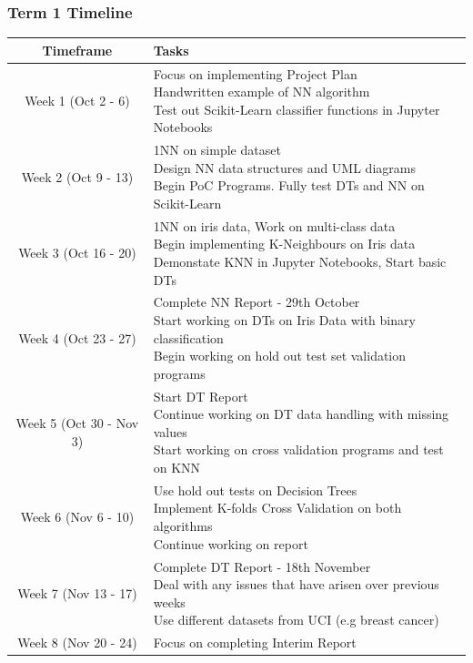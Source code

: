 \documentclass[letterpaper,10pt]{article}
\begin{document}
\subsubsection{Term 1 Timeline}
\begin{tabular}{|c|p{10cm}|}
\hline
Timeframe & Tasks \\
\hline
Week 1 (Oct 2 - 6) & 
\makecell[l]{Focus on implementing Project Plan \\
Handwritten example of NN algorithm \\
Test out Scikit-Learn classifier functions in Jupyter Notebooks } \\
\hline
Week 2 (Oct 9 - 13) & 
\makecell[l]{1NN on simple dataset \\
Design NN data structures and UML diagrams \\
Begin PoC Programs. Fully test DTs and NN on Scikit-Learn} \\
\hline
Week 3 (Oct 16 - 20) & 
\makecell[l]{1NN on iris data, Work on multi-class data \\
Begin implementing K-Neighbours on Iris data \\
Demonstate KNN in Jupyter Notebooks, Start basic DTs} \\
\hline
Week 4 (Oct 23 - 27) & 
\makecell[l]{Complete NN Report - 29th October \\
Start working on DTs on Iris Data with binary classification \\
Begin working on hold out test set validation programs} \\
\hline
Week 5 (Oct 30 - Nov 3) & 
\makecell[l]{Start DT Report \\
Continue working on DT data handling with missing values \\
Start working on cross validation programs and test on KNN} \\
\hline
Week 6 (Nov 6 - 10) & 
\makecell[l]{Use hold out tests on Decision Trees \\
 Implement K-folds Cross Validation on both algorithms \\
Continue working on report} \\
\hline
Week 7 (Nov 13 - 17) & 
\makecell[l]{Complete DT Report - 18th November \\
Deal with any issues that have arisen over previous weeks \\
Use different datasets from UCI (e.g breast cancer)} \\
\hline
Week 8 (Nov 20 - 24) & 
\makecell[l]{ Focus on completing Interim Report \\
}
\end{tabular}
\end{document}
